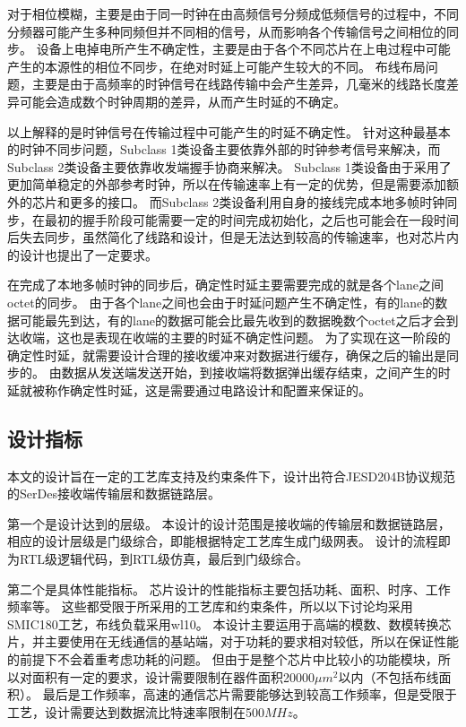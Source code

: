 \documentclass[UTF8]{ctexart}
\begin{document}
对于相位模糊，主要是由于同一时钟在由高频信号分频成低频信号的过程中，不同分频器可能产生多种同频但并不同相的信号，从而影响各个传输信号之间相位的同步。
设备上电掉电所产生不确定性，主要是由于各个不同芯片在上电过程中可能产生的本源性的相位不同步，在绝对时延上可能产生较大的不同。
布线布局问题，主要是由于高频率的时钟信号在线路传输中会产生差异，几毫米的线路长度差异可能会造成数个时钟周期的差异，从而产生时延的不确定。

以上解释的是时钟信号在传输过程中可能产生的时延不确定性。
针对这种最基本的时钟不同步问题，Subclass 1类设备主要依靠外部的时钟参考信号来解决，而Subclass 2类设备主要依靠收发端握手协商来解决。
Subclass 1类设备由于采用了更加简单稳定的外部参考时钟，所以在传输速率上有一定的优势，但是需要添加额外的芯片和更多的接口。
而Subclass 2类设备利用自身的接线完成本地多帧时钟同步，在最初的握手阶段可能需要一定的时间完成初始化，之后也可能会在一段时间后失去同步，虽然简化了线路和设计，但是无法达到较高的传输速率，也对芯片内的设计也提出了一定要求。

在完成了本地多帧时钟的同步后，确定性时延主要需要完成的就是各个lane之间octet的同步。
由于各个lane之间也会由于时延问题产生不确定性，有的lane的数据可能最先到达，有的lane的数据可能会比最先收到的数据晚数个octet之后才会到达收端，这也是表现在收端的主要的时延不确定性问题。
为了实现在这一阶段的确定性时延，就需要设计合理的接收缓冲来对数据进行缓存，确保之后的输出是同步的。
由数据从发送端发送开始，到接收端将数据弹出缓存结束，之间产生的时延就被称作确定性时延，这是需要通过电路设计和配置来保证的。

\subsection{设计指标}

本文的设计旨在一定的工艺库支持及约束条件下，设计出符合JESD204B协议规范的SerDes接收端传输层和数据链路层。

第一个是设计达到的层级。
本设计的设计范围是接收端的传输层和数据链路层，相应的设计层级是门级综合，即能根据特定工艺库生成门级网表。
设计的流程即为RTL级逻辑代码，到RTL级仿真，最后到门级综合。

第二个是具体性能指标。
芯片设计的性能指标主要包括功耗、面积、时序、工作频率等。
这些都受限于所采用的工艺库和约束条件，所以以下讨论均采用SMIC180工艺，布线负载采用wl10。
本设计主要运用于高端的模数、数模转换芯片，并主要使用在无线通信的基站端，对于功耗的要求相对较低，所以在保证性能的前提下不会着重考虑功耗的问题。
但由于是整个芯片中比较小的功能模块，所以对面积有一定的要求，设计需要限制在器件面积20000$\mu m^2$以内（不包括布线面积）。
最后是工作频率，高速的通信芯片需要能够达到较高工作频率，但是受限于工艺，设计需要达到数据流比特速率限制在500$MHz$。


\end{document}
